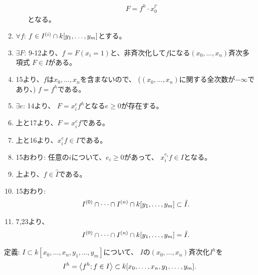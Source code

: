 \begin{myproof}
\begin{enumerate}
\begin{enumerate}
      \begin{align}
        F = f^h\cdot x_0^{l'}
      \end{align}
      となる。
    \end{enumerate}
    \item
    $\forall f$: $f\in I^{(i)} \cap k[y_1,\dots,y_m]$とする。
    \item $\exists F$:
    9-12より、$f=F(x_i=1)$と、非斉次化して$f$になる$(x_0,\dots,x_n)$斉次多項式 $F\in I$がある。
    \item
    15より、$f$は$x_0,\dots,x_n$を含まないので、
    ($(x_0,\dots,x_n)$に関する全次数が$-\infty$であり、)
    $f=f^h$である。
    \item $\exists e$:
    14より、
    $F=x_i^e f^h$となる$e\ge 0$が存在する。
    \item 上と17より、$F=x_i^e f$である。
    \item 上と16より、$x_i^e f \in I$である。
    \item 15おわり: 任意の$i$について、$e_i\ge 0$があって、
    $x_i^{e_i} f \in I$となる。
    \item 上より、$f \in \hat I$である。
    \item 15おわり:
    \begin{align}
      I^{(0)}\cap \dots \cap I^{(n)} \cap k[y_1,\dots,y_m] \subset \hat I.
    \end{align}
    \item
    7,23より、
    \begin{align}
      I^{(0)} \cap \dots \cap I^{(n)} \cap k[y_1,\dots,y_m] = \hat I.
    \end{align}
  \end{enumerate}
\end{myproof}

\begin{framed}
  定義:
  $I\subset k[x_0,\dots,x_n,y_1,\dots,y_m]$について、
  $I$の$(x_0,\dots,x_n)$斉次化$I^h$を
  \begin{align}
    I^h = \left\langle f^h; f\in I \right\rangle\subset
    k[x_0,\dots,x_n,y_1,\dots,y_m].
  \end{align}
\end{framed}

